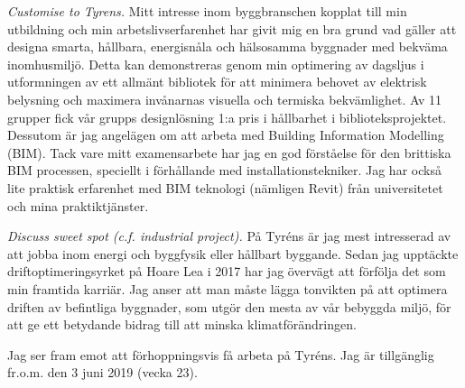 \documentclass[11pt,a4paper,roman]{moderncv}        %
\begin{document}
\textit{Customise to Tyrens.}
Mitt intresse inom byggbranschen kopplat till min utbildning och min arbetslivserfarenhet har givit mig en bra grund vad g{\"a}ller att designa smarta, h{\aa}llbara, energisn{\aa}la och h{\"a}lsosamma byggnader med bekv{\"a}ma inomhusmilj{\"o}.
Detta kan demonstreras genom min optimering av dagsljus i utformningen av ett allm{\"a}nt bibliotek f{\"o}r att minimera behovet av elektrisk belysning och maximera inv{\aa}narnas visuella och termiska bekv{\"a}mlighet.
Av 11 grupper fick v{\aa}r grupps designl{\"o}sning 1:a pris i h{\aa}llbarhet i biblioteksprojektet.
Dessutom {\"a}r jag angel{\"a}gen om att arbeta med Building Information Modelling (BIM).
Tack vare mitt examensarbete har jag en god f{\"o}rst{\aa}else f{\"o}r den brittiska BIM processen, speciellt i f{\"o}rh{\aa}llande med installationstekniker.
Jag har ocks{\aa} lite praktisk erfarenhet med BIM teknologi (n{\"a}mligen Revit) fr{\aa}n universitetet och mina praktiktj{\"a}nster.


\textit{Discuss sweet spot (c.f. industrial project).}
P{\aa} Tyr{\'e}ns {\"a}r jag mest intresserad av att jobba inom energi och byggfysik eller h{\aa}llbart byggande.
Sedan jag uppt{\"a}ckte driftoptimeringsyrket p{\aa} Hoare Lea i 2017 har jag {\"o}verv{\"a}gt att f{\"o}rf{\"o}lja det som min framtida karri{\"a}r.
Jag anser att man m{\aa}ste l{\"a}gga tonvikten p{\aa} att optimera driften av befintliga byggnader, som utg{\"o}r den mesta av v{\aa}r bebyggda milj{\"o}, f{\"o}r att ge ett betydande bidrag till att minska klimatf{\"o}r{\"a}ndringen.


Jag ser fram emot att f{\"o}rhoppningsvis f{\aa} arbeta p{\aa} Tyr{\'e}ns.
Jag {\"a}r tillg{\"a}nglig fr.o.m. den 3 juni 2019 (vecka 23).
\end{document}

